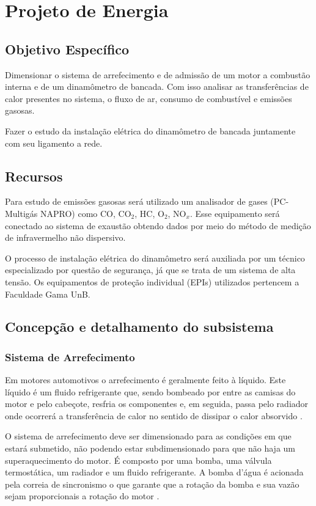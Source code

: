 \chapter[Projeto de Energia]{Projeto de Energia}

\section{Objetivo Específico}

Dimensionar o sistema de arrefecimento e de admissão de um motor a combustão interna e de um dinamômetro de bancada. Com isso analisar as transferências de calor presentes no sistema, o fluxo de ar, consumo de combustível e emissões gasosas.

Fazer o estudo da instalação elétrica do dinamômetro de bancada juntamente com seu ligamento a rede.

\section{Recursos}

Para estudo de emissões gasosas será utilizado um analisador de gases (PC-Multigás NAPRO) como CO, CO$_{2}$, HC, O$_{2}$, NO$_{x}$. Esse equipamento será conectado ao sistema de exaustão obtendo dados por meio do método de medição de infravermelho não dispersivo. 

O processo de instalação elétrica do dinamômetro será auxiliada por um técnico especializado por questão de segurança, já que se trata de um sistema de alta tensão. Os equipamentos de proteção individual (EPIs) utilizados pertencem a Faculdade Gama UnB.

\section{Concepção e detalhamento do subsistema}

\subsection{Sistema de Arrefecimento}

Em motores automotivos o arrefecimento é geralmente feito à líquido. Este líquido é um fluido refrigerante que, sendo bombeado por entre as camisas do motor e pelo cabeçote, resfria os componentes e, em seguida, passa pelo radiador onde ocorrerá a transferência de calor no sentido de dissipar o calor absorvido \cite{energiaToyota}.

O sistema de arrefecimento deve ser dimensionado para as condições em que estará submetido, não podendo estar subdimensionado para que não haja um superaquecimento do motor. É composto por uma bomba, uma válvula termostática, um radiador e um fluido refrigerante. A bomba d'água é acionada pela correia de sincronismo o que garante que a rotação da bomba e sua vazão sejam proporcionais a rotação do motor \cite{energiaToyota}. 

